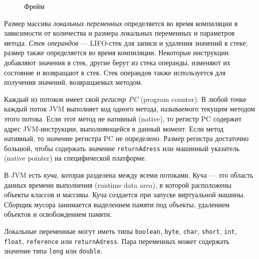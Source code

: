 \documentclass[14pt]{extarticle}
\begin{document}
\begin{figure} [h]
\caption{Фрейм}\label{pic_Frame}
\end{figure}

Размер массива \textit{локальных переменных} определяется во время компиляции в зависимости от количества и размера локальных переменных и параметров метода. \textit{Стек операндов} --- LIFO-стек для записи и удаления значений в стеке; размер также определяется во время компиляции. Некоторые инструкции добавляют значения в стек, другие берут из стека операнды, изменяют их состояние и возвращают в стек. Стек операндов также используется для получения значений, возвращаемых методом. 

Каждый из потоков имеет свой \textit{регистр PC} (program counter). В любой точке каждый поток JVM выполняет код одного метода, называемого текущим методом этого потока. Если этот метод не нативный (native), то регистр PC содержит адрес JVM-инструкции, выполняющейся в данный момент. Если метод нативный, то значение регистра PC не определено. Размер регистра достаточно большой, чтобы содержать значение \texttt{returnAdress} или машинный указатель (native pointer) на специфической платформе.

В JVM есть \textit{куча}, которая разделена между всеми потоками. Куча --- это область данных времени выполнения (runtime data area), в которой расположены объекты классов и массивы. Куча создается при запуске виртуальной машины. Сборщик мусора занимается выделением памяти под объекты, удалением объектов и освобождением памяти.

Локальные переменные могут иметь типы \texttt{boolean}, \texttt{byte}, \texttt{char}, \texttt{short}, \texttt{int}, \texttt{float}, \texttt{reference} или \texttt{returnAdress}. Пара переменных может содержать значение типа \texttt{long} или \texttt{double}.

\end{document}
